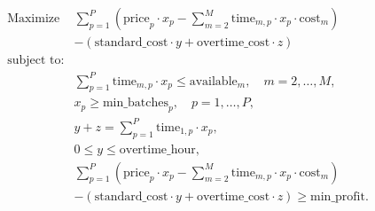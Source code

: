 \documentclass{article}
\begin{document}
\begin{align*}
\text{Maximize } & \sum_{p=1}^{P} \left( \text{price}_p \cdot x_p - \sum_{m=2}^{M} \text{time}_{m,p} \cdot x_p \cdot \text{cost}_m \right) \\
& - \left( \text{standard\_cost} \cdot y + \text{overtime\_cost} \cdot z \right) \\
\text{subject to:} \\
& \sum_{p=1}^{P} \text{time}_{m,p} \cdot x_p \leq \text{available}_m, \quad m = 2, \ldots, M, \\
& x_p \geq \text{min\_batches}_p, \quad p = 1, \ldots, P, \\
& y + z = \sum_{p=1}^{P} \text{time}_{1,p} \cdot x_p, \\
& 0 \leq y \leq \text{overtime\_hour}, \\
& \sum_{p=1}^{P} \left( \text{price}_p \cdot x_p - \sum_{m=2}^{M} \text{time}_{m,p} \cdot x_p \cdot \text{cost}_m \right) \\
& - \left( \text{standard\_cost} \cdot y + \text{overtime\_cost} \cdot z \right) \geq \text{min\_profit}.
\end{align*}
\end{document}
